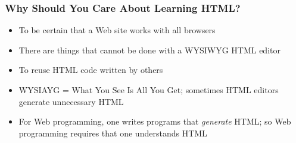 \documentclass[dvipsnames]{beamer}
\begin{document}
\begin{frame}
\frametitle{Why Should You Care About Learning HTML?}

\begin{itemize}
  
\item To be certain that a Web site works with all browsers
  
\item There are things that cannot be done with a WYSIWYG HTML editor
  
\item To reuse HTML code written by others
  
\item WYSIAYG = What You See Is All You Get; sometimes HTML editors
  generate unnecessary HTML
  
\item For Web programming, one writes programs that \emph{generate}
  HTML; so Web programming requires that one understands HTML

\end{itemize}
\end{frame}




\end{document}
